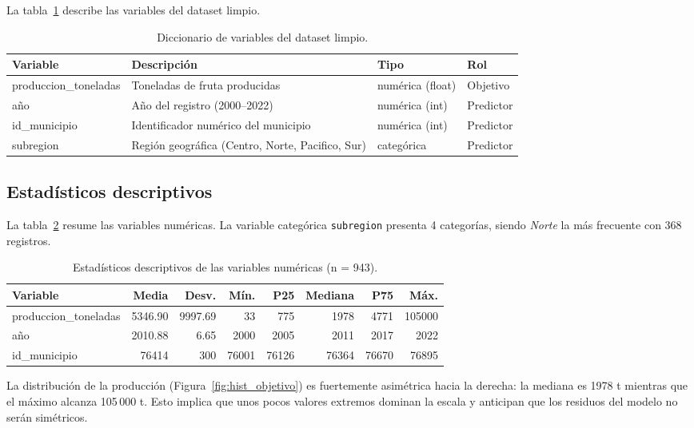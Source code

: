 \documentclass[11pt,a4paper]{article}
\begin{document}
La tabla~\ref{tab:diccionario} describe las variables del dataset limpio.

\begin{table}[htbp]
  \centering
  \caption{Diccionario de variables del dataset limpio.}
  \label{tab:diccionario}
  \small
  \begin{tabular}{lp{6cm}ll}
    \hline
    Variable & Descripción & Tipo & Rol \\
    \hline
    produccion\_toneladas & Toneladas de fruta producidas & numérica (float) & Objetivo \\
    año & Año del registro (2000--2022) & numérica (int) & Predictor \\
    id\_municipio & Identificador numérico del municipio & numérica (int) & Predictor \\
    subregion & Región geográfica (Centro, Norte, Pacifico, Sur) & categórica & Predictor \\
    \hline
  \end{tabular}
\end{table}

\subsection{Estadísticos descriptivos}

La tabla~\ref{tab:descriptivos} resume las variables numéricas. La variable categórica
\texttt{subregion} presenta 4 categorías, siendo \emph{Norte} la más frecuente con 368 registros.

\begin{table}[htbp]
  \centering
  \caption{Estadísticos descriptivos de las variables numéricas (n = 943).}
  \label{tab:descriptivos}
  \footnotesize
  \setlength{\tabcolsep}{4pt}
  \begin{tabular}{lrrrrrrr}
    \hline
    Variable & Media & Desv. & Mín. & P25 & Mediana & P75 & Máx. \\
    \hline
    produccion\_toneladas & 5346.90 & 9997.69 & 33 & 775 & 1978 & 4771 & 105000 \\
    año & 2010.88 & 6.65 & 2000 & 2005 & 2011 & 2017 & 2022 \\
    id\_municipio & 76414 & 300 & 76001 & 76126 & 76364 & 76670 & 76895 \\
    \hline
  \end{tabular}
\end{table}

La distribución de la producción (Figura~\ref{fig:hist_objetivo}) es fuertemente asimétrica hacia
la derecha: la mediana es 1978 t mientras que el máximo alcanza 105\,000 t. Esto implica que unos
pocos valores extremos dominan la escala y anticipan que los residuos del modelo no serán
simétricos.
\end{document}
